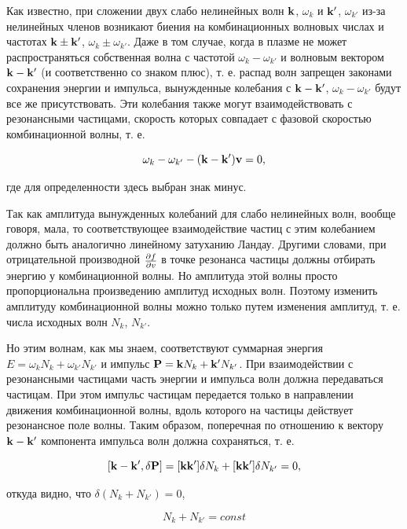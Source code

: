 \documentclass[10pt, a4paper]{article}
\begin{document}
Как известно, при сложении двух слабо нелинейных волн $\vb{k}$, $\omega_k$ и $\vb{k}'$, $\omega_{k'}$ из-за нелинейных членов возникают биения на комбинационных волновых числах и частотах $\vb{k}\pm\vb{k}'$, $\omega_k\pm\omega_{k'}$. Даже в том случае, когда в плазме не может распространяться собственная волна с частотой $\omega_k-\omega_{k'}$ и волновым вектором $\vb{k}-\vb{k}'$ (и соответственно со знаком плюс), т. е. распад волн запрещен законами сохранения энергии и импульса, вынужденные колебания с $\vb{k}-\vb{k}'$, $\omega_k-\omega_{k'}$ будут все же присутствовать. Эти колебания также могут взаимодействовать с резонансными частицами, скорость которых совпадает с фазовой скоростью комбинационной волны, т. е.

\begin{equation*}
	\omega_k-\omega_{k'}-(\vb{k}-\vb{k}')\vb{v} = 0,
\end{equation*}

где для определенности здесь выбран знак минус.

Так как амплитуда вынужденных колебаний для слабо нелинейных волн, вообще говоря, мала, то соответствующее взаимодействие частиц с этим колебанием должно быть аналогично линейному затуханию Ландау. Другими словами, при отрицательной производной $\pdv{f}{v}$ в точке резонанса частицы должны отбирать энергию у комбинационной волны. Но амплитуда этой волны просто пропорциональна произведению амплитуд исходных волн. Поэтому изменить амплитуду комбинационной волны можно только путем изменения амплитуд, т. е. числа исходных волн $N_k$, $N_{k'}$.

Но этим волнам, как мы знаем, соответствуют суммарная энергия $E = \omega_kN_k+\omega_{k'}N_{k'}$ и импульс $\vb{P} = \vb{k}N_k+\vb{k}'N_{k'}$. При взаимодействии с резонансными частицами часть энергии и импульса волн должна передаваться частицам. При этом импульс частицам передается только в направлении движения комбинационной волны, вдоль которого на частицы действует резонансное поле волны. Таким образом, поперечная по отношению к вектору $\vb{k}-\vb{k}'$ компонента импульса волн должна сохраняться, т. е. 

\begin{equation*}
	\left[\vb{k}-\vb{k}',\delta\vb{P}\right] = [\vb{k}\vb{k}']\delta N_k + [\vb{k}\vb{k}']\delta N_{k'} = 0,
\end{equation*}

откуда видно, что $\delta(N_k+N_{k'})=0$,

\begin{equation*}
	N_k+N_{k'} = const
\end{equation*}
\end{document}

